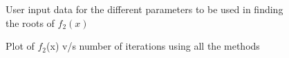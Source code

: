 \documentclass[12pt,a4paper]{article}
\begin{document}
\clearpage
\begin{figure}[!ht]
	\begin{center}
	\end{center}
	\caption{User input data for the different parameters to be used in finding the roots of $f_2(x)$}
\end{figure}
\begin{figure}[!ht]
	\begin{center}
	\end{center}
	\caption{Plot of $f_2$(x) v/s number of iterations using all the methods}
\end{figure}
\end{document}
